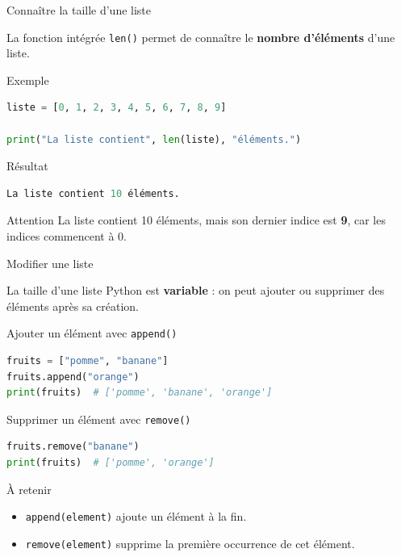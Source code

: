 \documentclass[10pt]{beamer}
\begin{document}
\begin{frame}[fragile]{Connaître la taille d'une liste}

La fonction intégrée \texttt{len()} permet de connaître le
\textbf{nombre d'éléments} d'une liste.

\begin{exampleblock}{Exemple}
\begin{lstlisting}[language=Python]
liste = [0, 1, 2, 3, 4, 5, 6, 7, 8, 9]

print("La liste contient", len(liste), "éléments.")
\end{lstlisting}
\end{exampleblock}


\begin{block}{Résultat}
\begin{lstlisting}[language=Python]
La liste contient 10 éléments.
\end{lstlisting}
\end{block}

\begin{alertblock}{Attention}
La liste contient 10 éléments, mais son dernier indice est
\textbf{9}, car les indices commencent à 0.
\end{alertblock}

\end{frame}
\begin{frame}[fragile]{Modifier une liste}

La taille d'une liste Python est \textbf{variable} :
on peut ajouter ou supprimer des éléments après sa création.

\vspace{0.3cm}

\begin{exampleblock}{Ajouter un élément avec \texttt{append()}}
\begin{lstlisting}[language=Python]
fruits = ["pomme", "banane"]
fruits.append("orange")
print(fruits)  # ['pomme', 'banane', 'orange']
\end{lstlisting}
\end{exampleblock}

\begin{exampleblock}{Supprimer un élément avec \texttt{remove()}}
\begin{lstlisting}[language=Python]
fruits.remove("banane")
print(fruits)  # ['pomme', 'orange']
\end{lstlisting}
\end{exampleblock}

\begin{alertblock}{À retenir}
\begin{itemize}
    \item \texttt{append(element)} ajoute un élément à la fin.
    \item \texttt{remove(element)} supprime la première occurrence de cet élément.
\end{itemize}
\end{alertblock}

\end{frame}
\end{document}
